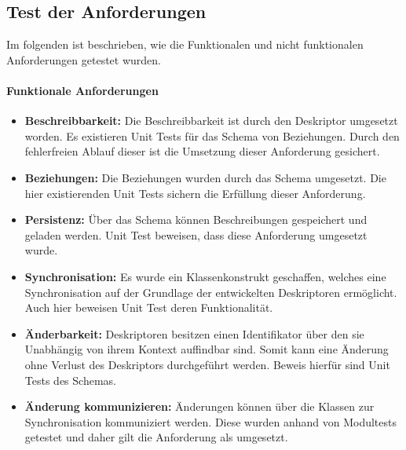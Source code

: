 \documentclass[a4paper]{article}
\begin{document}
	\subsection{Test der Anforderungen }
	Im folgenden ist beschrieben, wie die Funktionalen und nicht funktionalen
	Anforderungen getestet wurden.
	
	\paragraph{Funktionale Anforderungen}
	\begin{itemize}
		\item \textbf{Beschreibbarkeit:} Die Beschreibbarkeit ist durch den
		Deskriptor umgesetzt worden. Es existieren Unit Tests für das Schema
		von Beziehungen. Durch den fehlerfreien Ablauf dieser ist die
		Umsetzung dieser Anforderung gesichert.
		\newpage
		\item \textbf{Beziehungen:} Die Beziehungen wurden durch das Schema
		umgesetzt. Die hier existierenden Unit Tests sichern die Erfüllung
		dieser Anforderung.
		\item \textbf{Persistenz:} Über das Schema können Beschreibungen gespeichert
		und geladen werden. Unit Test beweisen, dass diese Anforderung umgesetzt
		wurde.
		\item \textbf{Synchronisation:} Es wurde ein Klassenkonstrukt geschaffen,
		welches eine Synchronisation auf der Grundlage der entwickelten Deskriptoren
		ermöglicht. Auch hier beweisen Unit Test deren Funktionalität.
		\item \textbf{Änderbarkeit:} Deskriptoren besitzen einen Identifikator über
		den sie Unabhängig von ihrem Kontext auffindbar sind. Somit kann
		eine Änderung ohne Verlust des Deskriptors durchgeführt werden. 
		Beweis hierfür sind Unit Tests des Schemas.
		\item \textbf{Änderung kommunizieren:} Änderungen können über die
		Klassen zur Synchronisation kommuniziert werden. Diese wurden anhand
		von Modultests getestet und daher gilt die Anforderung als umgesetzt.
	\end{itemize} 	
	
\end{document}
